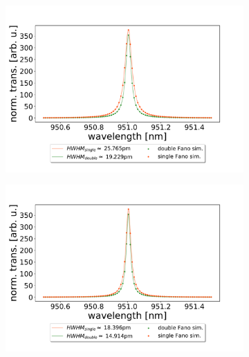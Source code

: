 \begin{figure}[h!]
    \centering
    \begin{subfigure}[b]{0.49\textwidth}
        \includegraphics[width=\textwidth]{figures/sim_single_vs_double_90um.pdf}
        \caption{}
        \label{fig:single_vs_double_simulation_90um}
    \end{subfigure}
    \begin{subfigure}[b]{0.49\textwidth}
        \includegraphics[width=\textwidth]{figures/sim_single_vs_double_150um.pdf}
        \caption{}
        \label{fig:single_vs_double_simulation_150um}
    \end{subfigure}
\end{figure}

